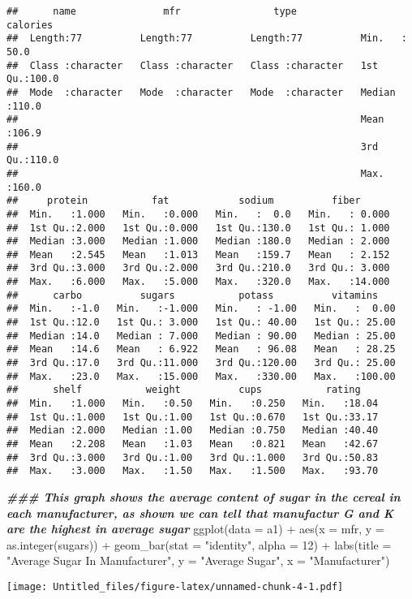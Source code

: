 \documentclass[
]{article}
\newenvironment{Shaded}{\begin{snugshade}}{\end{snugshade}}
\newcommand{\AttributeTok}[1]{\textcolor[rgb]{0.77,0.63,0.00}{#1}}
\newcommand{\DecValTok}[1]{\textcolor[rgb]{0.00,0.00,0.81}{#1}}
\newcommand{\DocumentationTok}[1]{\textcolor[rgb]{0.56,0.35,0.01}{\textbf{\textit{#1}}}}
\newcommand{\FunctionTok}[1]{\textcolor[rgb]{0.00,0.00,0.00}{#1}}
\newcommand{\NormalTok}[1]{#1}
\newcommand{\SpecialCharTok}[1]{\textcolor[rgb]{0.00,0.00,0.00}{#1}}
\newcommand{\StringTok}[1]{\textcolor[rgb]{0.31,0.60,0.02}{#1}}
\begin{document}
\begin{verbatim}
##      name               mfr                type              calories    
##  Length:77          Length:77          Length:77          Min.   : 50.0  
##  Class :character   Class :character   Class :character   1st Qu.:100.0  
##  Mode  :character   Mode  :character   Mode  :character   Median :110.0  
##                                                           Mean   :106.9  
##                                                           3rd Qu.:110.0  
##                                                           Max.   :160.0  
##     protein           fat            sodium          fiber       
##  Min.   :1.000   Min.   :0.000   Min.   :  0.0   Min.   : 0.000  
##  1st Qu.:2.000   1st Qu.:0.000   1st Qu.:130.0   1st Qu.: 1.000  
##  Median :3.000   Median :1.000   Median :180.0   Median : 2.000  
##  Mean   :2.545   Mean   :1.013   Mean   :159.7   Mean   : 2.152  
##  3rd Qu.:3.000   3rd Qu.:2.000   3rd Qu.:210.0   3rd Qu.: 3.000  
##  Max.   :6.000   Max.   :5.000   Max.   :320.0   Max.   :14.000  
##      carbo          sugars           potass          vitamins     
##  Min.   :-1.0   Min.   :-1.000   Min.   : -1.00   Min.   :  0.00  
##  1st Qu.:12.0   1st Qu.: 3.000   1st Qu.: 40.00   1st Qu.: 25.00  
##  Median :14.0   Median : 7.000   Median : 90.00   Median : 25.00  
##  Mean   :14.6   Mean   : 6.922   Mean   : 96.08   Mean   : 28.25  
##  3rd Qu.:17.0   3rd Qu.:11.000   3rd Qu.:120.00   3rd Qu.: 25.00  
##  Max.   :23.0   Max.   :15.000   Max.   :330.00   Max.   :100.00  
##      shelf           weight          cups           rating     
##  Min.   :1.000   Min.   :0.50   Min.   :0.250   Min.   :18.04  
##  1st Qu.:1.000   1st Qu.:1.00   1st Qu.:0.670   1st Qu.:33.17  
##  Median :2.000   Median :1.00   Median :0.750   Median :40.40  
##  Mean   :2.208   Mean   :1.03   Mean   :0.821   Mean   :42.67  
##  3rd Qu.:3.000   3rd Qu.:1.00   3rd Qu.:1.000   3rd Qu.:50.83  
##  Max.   :3.000   Max.   :1.50   Max.   :1.500   Max.   :93.70
\end{verbatim}

\begin{Shaded}
\begin{Highlighting}[]
\DocumentationTok{\#\#\# This graph shows the average content of sugar in the cereal in each manufacturer, as shown we can tell that manufactur G and K are the highest in average sugar}
\FunctionTok{ggplot}\NormalTok{(}\AttributeTok{data =}\NormalTok{ a1) }\SpecialCharTok{+}
  \FunctionTok{aes}\NormalTok{(}\AttributeTok{x =}\NormalTok{ mfr, }\AttributeTok{y =} \FunctionTok{as.integer}\NormalTok{(sugars)) }\SpecialCharTok{+}
  \FunctionTok{geom\_bar}\NormalTok{(}\AttributeTok{stat =} \StringTok{"identity"}\NormalTok{, }\AttributeTok{alpha =} \DecValTok{12}\NormalTok{) }\SpecialCharTok{+}
  \FunctionTok{labs}\NormalTok{(}\AttributeTok{title =} \StringTok{"Average Sugar In Manufacturer"}\NormalTok{,}
       \AttributeTok{y =} \StringTok{"Average Sugar"}\NormalTok{,}
       \AttributeTok{x =} \StringTok{"Manufacturer"}\NormalTok{)}
\end{Highlighting}
\end{Shaded}

\texttt{[image: Untitled\_files/figure-latex/unnamed-chunk-4-1.pdf]}
\end{document}
